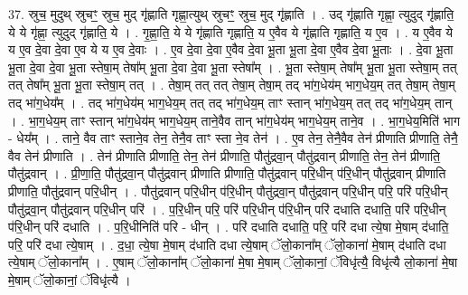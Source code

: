 \documentclass[17pt]{extarticle}
\begin{document}
37. स्रुच॒ मुदुथ् स्रुचꣳ॒॒ स्रुच॒ मुद् गृ॑ह्णाति गृह्णा॒त्युथ् स्रुचꣳ॒॒ स्रुच॒ मुद् गृ॑ह्णाति । . उद् गृ॑ह्णाति गृह्णा॒ त्युदुद् गृ॑ह्णाति॒ ये ये गृ॑ह्णा॒ त्युदुद् गृ॑ह्णाति॒ ये । . गृ॒ह्णा॒ति॒ ये ये गृ॑ह्णाति गृह्णाति॒ य ए॒वैव ये गृ॑ह्णाति गृह्णाति॒ य ए॒व । . य ए॒वैव ये य ए॒व दे॒वा दे॒वा ए॒व ये य ए॒व दे॒वाः । . ए॒व दे॒वा दे॒वा ए॒वैव दे॒वा भू॒ता भू॒ता दे॒वा ए॒वैव दे॒वा भू॒ताः । . दे॒वा भू॒ता भू॒ता दे॒वा दे॒वा भू॒ता स्तेषा॒म् तेषा᳚म् भू॒ता दे॒वा दे॒वा भू॒ता स्तेषा᳚म् । . भू॒ता स्तेषा॒म् तेषा᳚म् भू॒ता भू॒ता स्तेषा॒म् तत् तत् तेषा᳚म् भू॒ता भू॒ता स्तेषा॒म् तत् । . तेषा॒म् तत् तत् तेषा॒म् तेषा॒म् तद् भा॑ग॒धेय॑म् भाग॒धेय॒म् तत् तेषा॒म् तेषा॒म् तद् भा॑ग॒धेय᳚म् । . तद् भा॑ग॒धेय॑म् भाग॒धेय॒म् तत् तद् भा॑ग॒धेय॒म् ताꣳ स्तान् भा॑ग॒धेय॒म् तत् तद् भा॑ग॒धेय॒म् तान् । . भा॒ग॒धेय॒म् ताꣳ स्तान् भा॑ग॒धेय॑म् भाग॒धेय॒म् ताने॒वैव तान् भा॑ग॒धेय॑म् भाग॒धेय॒म् ताने॒व । . भा॒ग॒धेय॒मिति॑ भाग - धेय᳚म् । . ताने॒ वैव ताꣳ स्ताने॒व तेन॒ तेनै॒व ताꣳ स्ता ने॒व तेन॑ । . ए॒व तेन॒ तेनै॒वैव तेन॑ प्रीणाति प्रीणाति॒ तेनै॒ वैव तेन॑ प्रीणाति । . तेन॑ प्रीणाति प्रीणाति॒ तेन॒ तेन॑ प्रीणाति॒ पौतु॑द्रवा॒न् पौतु॑द्रवान् प्रीणाति॒ तेन॒ तेन॑ प्रीणाति॒ पौतु॑द्रवान् । . प्री॒णा॒ति॒ पौतु॑द्रवा॒न् पौतु॑द्रवान् प्रीणाति प्रीणाति॒ पौतु॑द्रवान् परि॒धीन् प॑रि॒धीन् पौतु॑द्रवान् प्रीणाति प्रीणाति॒ पौतु॑द्रवान् परि॒धीन् । . पौतु॑द्रवान् परि॒धीन् प॑रि॒धीन् पौतु॑द्रवा॒न् पौतु॑द्रवान् परि॒धीन् परि॒ परि॑ परि॒धीन् पौतु॑द्रवा॒न् पौतु॑द्रवान् परि॒धीन् परि॑ । . प॒रि॒धीन् परि॒ परि॑ परि॒धीन् प॑रि॒धीन् परि॑ दधाति दधाति॒ परि॑ परि॒धीन् प॑रि॒धीन् परि॑ दधाति । . प॒रि॒धीनिति॑ परि - धीन् । . परि॑ दधाति दधाति॒ परि॒ परि॑ दधा त्ये॒षा मे॒षाम् द॑धाति॒ परि॒ परि॑ दधा त्ये॒षाम् । . द॒धा॒ त्ये॒षा मे॒षाम् द॑धाति दधा त्ये॒षाम् ॅलो॒काना᳚म् ॅलो॒काना॑ मे॒षाम् द॑धाति दधा त्ये॒षाम् ॅलो॒काना᳚म् । . ए॒षाम् ॅलो॒काना᳚म् ॅलो॒काना॑ मे॒षा मे॒षाम् ॅलो॒कानां॒ ॅविधृ॑त्यै॒ विधृ॑त्यै लो॒काना॑ मे॒षा मे॒षाम् ॅलो॒कानां॒ ॅविधृ॑त्यै । \newline
\pagebreak
{}
\end{document}
